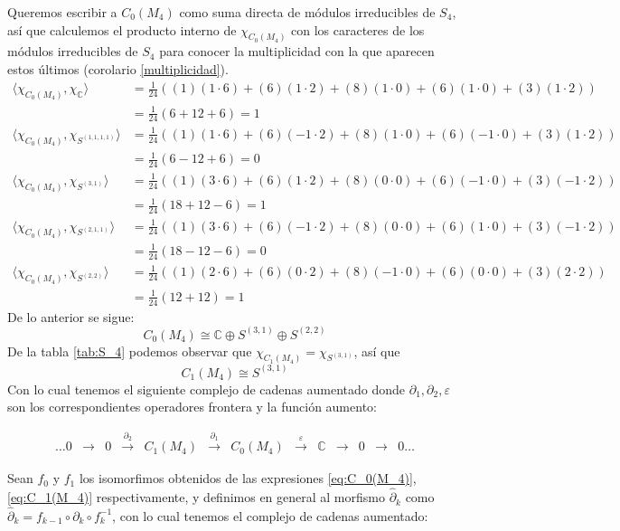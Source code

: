 \documentclass[12pt]{book}
\theoremstyle{definition}
\newcounter{in}
\newcounter{ini}
\begin{document}
Queremos escribir a $C_{0}(M_{4})$ como suma directa de módulos
irreducibles de $S_{4}$, así que calculemos el producto interno de $\chi_{C_{0}(M_{4})}$ con los
caracteres de los módulos irreducibles de $S_{4}$ para conocer la
multiplicidad con la que aparecen estos últimos (corolario \ref{multiplicidad}).
\begin{align*}
  \langle\chi_{C_{0}(M_{4})},\chi_{\mathbb{C}}\rangle &=\frac{1}{24}((1)(1\cdot6)+(6)(1\cdot2)+(8)(1\cdot0)+(6)(1\cdot0)+(3)(1\cdot2))\\
  &=\frac{1}{24}(6+12+6)=1\\
  \langle\chi_{C_{0}(M_{4})},\chi_{S^{(1,1,1,1)}}\rangle &=\frac{1}{24}((1)(1\cdot6)+(6)(-1\cdot2)+(8)(1\cdot0)+(6)(-1\cdot0)+(3)(1\cdot2))\\
  &=\frac{1}{24}(6-12+6)=0\\
  \langle\chi_{C_{0}(M_{4})},\chi_{S^{(3,1)}}\rangle &=\frac{1}{24}((1)(3\cdot6)+(6)(1\cdot2)+(8)(0\cdot0)+(6)(-1\cdot0)+(3)(-1\cdot2))\\
  &=\frac{1}{24}(18+12-6)=1\\
  \langle\chi_{C_{0}(M_{4})},\chi_{S^{(2,1,1)}}\rangle &=\frac{1}{24}((1)(3\cdot6)+(6)(-1\cdot2)+(8)(0\cdot0)+(6)(1\cdot0)+(3)(-1\cdot2))\\
  &=\frac{1}{24}(18-12-6)=0\\
  \langle\chi_{C_{0}(M_{4})},\chi_{S^{(2,2)}}\rangle &=\frac{1}{24}((1)(2\cdot6)+(6)(0\cdot2)+(8)(-1\cdot0)+(6)(0\cdot0)+(3)(2\cdot2))\\
  &=\frac{1}{24}(12+12)=1
\end{align*}
De lo anterior se sigue:
\begin{equation}
\label{eq:C_0(M_4)}
C_{0}(M_{4})\cong \mathbb{C}\oplus S^{(3,1)}\oplus S^{(2,2)}
\end{equation}
De la tabla \ref{tab:S_4}
podemos observar que $\chi_{C_{1}(M_{4})}=\chi_{S^{(3,1)}}$, así que  
\begin{equation}
\label{eq:C_1(M_4)}
C_{1}(M_{4})\cong S^{(3,1)}
\end{equation}
Con lo cual tenemos el siguiente complejo de cadenas aumentado
donde $\partial_{1},\partial_{2},\varepsilon$ son los correspondientes
operadores frontera y la función aumento:

\begin{small}
  \[
    \begin{array}{ccccccccccccc}
      \dots 0 & \rightarrow & 0 &
      \stackrel{\partial_{2}}{\rightarrow} & C_{1}(M_{4}) &
      \stackrel{\partial_{1}}{\rightarrow} & C_{0}(M_{4}) & \stackrel{\varepsilon}{\rightarrow} &
      \mathbb{C} & \rightarrow  & 0 & \rightarrow & 0 \dots
    \end{array} 
    \]
  \end{small}
Sean $f_{0}$ y $f_{1}$ los isomorfimos obtenidos de las expresiones
\ref{eq:C_0(M_4)}, \ref{eq:C_1(M_4)} respectivamente, y definimos en
general al morfismo $\widehat\partial_{k}$ como
$\widehat\partial_{k}=f_{k-1}\circ \partial_{k}\circ f^{-1}_{k}$, con
lo cual tenemos el complejo de cadenas aumentado: 
\end{document}
